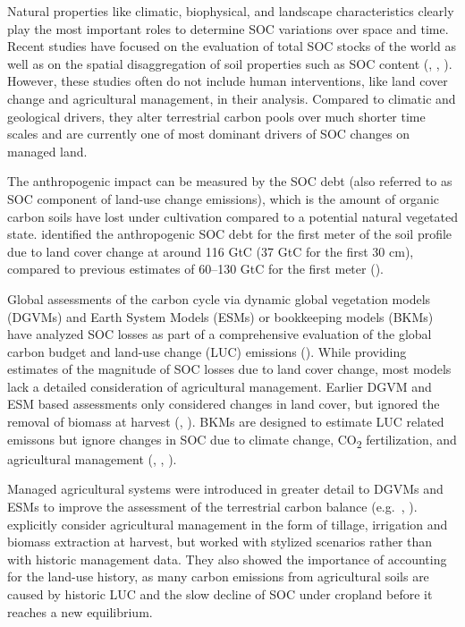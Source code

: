 \documentclass[gc, manuscript]{copernicus}
\begin{document}
Natural properties like climatic, biophysical, and landscape characteristics clearly play the most important roles to determine SOC variations over space and time. Recent studies have focused on the evaluation of total SOC stocks of the world as well as on the spatial disaggregation of soil properties such as SOC content (\citep{batjes_harmonized_2016}, \citep{hengl_soilgrids250m_2017}, \citep{fao_global_2018}). However, these studies often do not include human interventions, like land cover change and agricultural management, in their analysis. Compared to climatic and geological drivers, they alter terrestrial carbon pools over much shorter time scales and are currently one of most dominant drivers of SOC changes on managed land.

The anthropogenic impact can be measured by the SOC debt (also referred to as SOC component of land-use change emissions), which is the amount of organic carbon soils have lost under cultivation compared to a potential natural vegetated state. \citep{sanderman_soil_2017} identified the anthropogenic SOC debt for the first meter of the soil profile due to land cover change at around 116 GtC (37 GtC for the first 30 cm), compared to previous estimates of 60--130 GtC for the first meter (\citep{lal_world_2001}).

Global assessments of the carbon cycle via dynamic global vegetation models (DGVMs) and Earth System Models (ESMs) or bookkeeping models (BKMs) have analyzed SOC losses as part of a comprehensive evaluation of the global carbon budget and land-use change (LUC) emissions (\citep{friedlingstein_global_2019}). While providing estimates of the magnitude of SOC losses due to land cover change, most models lack a detailed consideration of agricultural management. Earlier DGVM and ESM based assessments only considered changes in land cover, but ignored the removal of biomass at harvest (\citep{strassmann_simulating_2008}, \citep{betts_climate_2015}). BKMs are designed to estimate LUC related emissons but ignore changes in SOC due to climate change, CO\textsubscript{2} fertilization, and agricultural management (\citep{friedlingstein_global_2019}, \citep{houghton_carbon_2012}, \citep{hansis_relevance_2015}).

Managed agricultural systems were introduced in greater detail to DGVMs and ESMs to improve the assessment of the terrestrial carbon balance (e.g.~\citep{bondeau_modelling_2007}, \citep{lindeskog_implications_2013}). \citep{pugh_simulated_2015} explicitly consider agricultural management in the form of tillage, irrigation and biomass extraction at harvest, but worked with stylized scenarios rather than with historic management data. They also showed the importance of accounting for the land-use history, as many carbon emissions from agricultural soils are caused by historic LUC and the slow decline of SOC under cropland before it reaches a new equilibrium.
\end{document}
